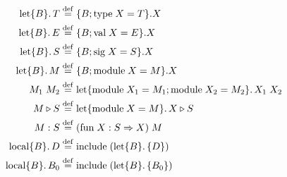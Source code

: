 \documentclass[12pt]{article}
\begin{document}
\pagestyle{empty}

\begin{align*}
    \mathrm{let}\{B\}\ldotp T &\stackrel{\mathrm{def}}{=} \{B; \mathrm{type}\; X = T\}.X
    \\
    \mathrm{let}\{B\}\ldotp E &\stackrel{\mathrm{def}}{=} \{B; \mathrm{val}\; X = E\}.X
    \\
    \mathrm{let}\{B\}\ldotp S &\stackrel{\mathrm{def}}{=} \{B; \mathrm{sig}\; X = S\}.X
    \\
    \mathrm{let}\{B\}\ldotp M &\stackrel{\mathrm{def}}{=} \{B; \mathrm{module}\; X = M\}.X
    \\
    M_1\; M_2 &\stackrel{\mathrm{def}}{=} \mathrm{let}\{\mathrm{module}\; X_1 = M_1; \mathrm{module}\; X_2 = M_2\}\ldotp X_1\; X_2
    \\
    M \triangleright S &\stackrel{\mathrm{def}}{=} \mathrm{let}\{\mathrm{module}\; X = M\}\ldotp X \triangleright S
    \\
    M: S &\stackrel{\mathrm{def}}{=} (\mathrm{fun}\; X: S \Rightarrow X)\; M
    \\
    \mathrm{local}\{B\}\ldotp D &\stackrel{\mathrm{def}}{=} \mathrm{include}\;(\mathrm{let}\{B\}\ldotp \{D\})
    \\
    \mathrm{local}\{B\}\ldotp B_0 &\stackrel{\mathrm{def}}{=} \mathrm{include}\;(\mathrm{let}\{B\}\ldotp \{B_0\})
\end{align*}
\end{document}
